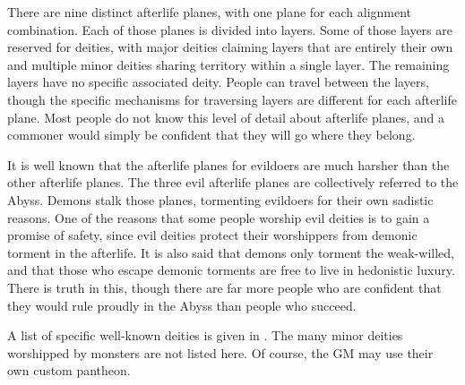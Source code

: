   There are nine distinct afterlife planes, with one plane for each alignment combination.
  Each of those planes is divided into layers.
  Some of those layers are reserved for deities, with major deities claiming layers that are entirely their own and multiple minor deities sharing territory within a single layer.
  The remaining layers have no specific associated deity.
  People can travel between the layers, though the specific mechanisms for traversing layers are different for each afterlife plane.
  Most people do not know this level of detail about afterlife planes, and a commoner would simply be confident that they will go where they belong.

  It is well known that the afterlife planes for evildoers are much harsher than the other afterlife planes.
  The three evil afterlife planes are collectively referred to the Abyss.
  Demons stalk those planes, tormenting evildoers for their own sadistic reasons.
  One of the reasons that some people worship evil deities is to gain a promise of safety, since evil deities protect their worshippers from demonic torment in the afterlife.
  It is also said that demons only torment the weak-willed, and that those who escape demonic torments are free to live in hedonistic luxury.
  There is truth in this, though there are far more people who are confident that they would rule proudly in the Abyss than people who succeed.

  A list of specific well-known deities is given in .
  The many minor deities worshipped by monsters are not listed here.
  Of course, the GM may use their own custom pantheon.

